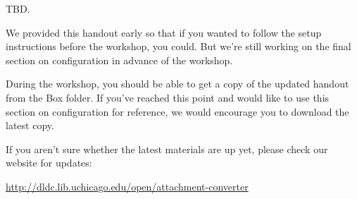 \documentclass[11pt]{article}
\begin{document}
TBD.  

We provided this handout early so that if you wanted to follow the
setup instructions before the workshop, you could.  But we're still
working on the final section on configuration in advance of the
workshop.

During the workshop, you should be able to get a copy of the updated
handout from the Box folder.  If you've reached this point and would
like to use this section on configuration for reference, we would
encourage you to download the latest copy.

If you aren't sure whether the latest materials are up yet, please
check our website for updates:

\url{http://dldc.lib.uchicago.edu/open/attachment-converter}
\end{document}
